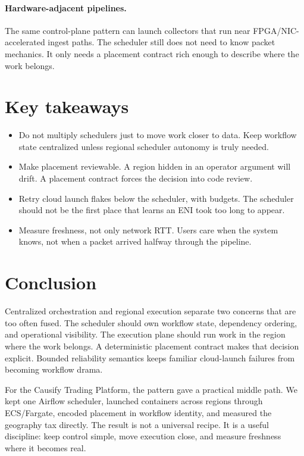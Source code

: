 \documentclass[11pt, reqno]{amsart}
\begin{document}
\paragraph{Hardware-adjacent pipelines.}
The same control-plane pattern can launch collectors that run near FPGA/NIC-accelerated ingest paths. The scheduler still does not need to know packet mechanics. It only needs a placement contract rich enough to describe where the work belongs.

\section*{Key takeaways}

\begin{itemize}
  \item Do not multiply schedulers just to move work closer to data. Keep workflow state centralized unless regional scheduler autonomy is truly needed.
  \item Make placement reviewable. A region hidden in an operator argument will drift. A placement contract forces the decision into code review.
  \item Retry cloud launch flakes below the scheduler, with budgets. The scheduler should not be the first place that learns an ENI took too long to appear.
  \item Measure freshness, not only network RTT. Users care when the system knows, not when a packet arrived halfway through the pipeline.
\end{itemize}

\section{Conclusion}
\label{sec:conclusion}

Centralized orchestration and regional execution separate two concerns that are too often fused. The scheduler should own workflow state, dependency ordering, and operational visibility. The execution plane should run work in the region where the work belongs. A deterministic placement contract makes that decision explicit. Bounded reliability semantics keeps familiar cloud-launch failures from becoming workflow drama.

For the Causify Trading Platform, the pattern gave a practical middle path. We kept one Airflow scheduler, launched containers across regions through ECS/Fargate, encoded placement in workflow identity, and measured the geography tax directly. The result is not a universal recipe. It is a useful discipline: keep control simple, move execution close, and measure freshness where it becomes real.
\end{document}
